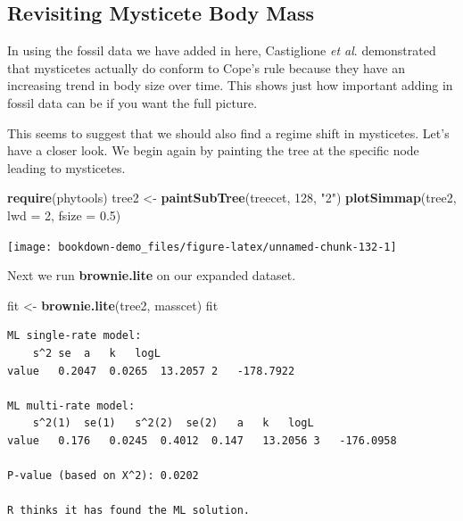 \documentclass[
]{book}
\newenvironment{Shaded}{\begin{snugshade}}{\end{snugshade}}
\newcommand{\DataTypeTok}[1]{\textcolor[rgb]{0.13,0.29,0.53}{#1}}
\newcommand{\DecValTok}[1]{\textcolor[rgb]{0.00,0.00,0.81}{#1}}
\newcommand{\FloatTok}[1]{\textcolor[rgb]{0.00,0.00,0.81}{#1}}
\newcommand{\KeywordTok}[1]{\textcolor[rgb]{0.13,0.29,0.53}{\textbf{#1}}}
\newcommand{\NormalTok}[1]{#1}
\newcommand{\StringTok}[1]{\textcolor[rgb]{0.31,0.60,0.02}{#1}}
\begin{document}
\hypertarget{revisiting-mysticete-body-mass}{%
\subsection{Revisiting Mysticete Body Mass}\label{revisiting-mysticete-body-mass}}

In using the fossil data we have added in here, Castiglione \emph{et al}. \citeyearpar{Castiglione20} demonstrated that mysticetes actually do conform to Cope's rule because they have an increasing trend in body size over time. This shows just how important adding in fossil data can be if you want the full picture.

This seems to suggest that we should also find a regime shift in mysticetes. Let's have a closer look. We begin again by painting the tree at the specific node leading to mysticetes.

\begin{Shaded}
\begin{Highlighting}[]
\KeywordTok{require}\NormalTok{(phytools)}
\NormalTok{tree2 \textless{}{-}}\StringTok{ }\KeywordTok{paintSubTree}\NormalTok{(treecet, }\DecValTok{128}\NormalTok{, }\StringTok{"2"}\NormalTok{)}
\KeywordTok{plotSimmap}\NormalTok{(tree2, }\DataTypeTok{lwd =} \DecValTok{2}\NormalTok{, }\DataTypeTok{fsize =} \FloatTok{0.5}\NormalTok{)}
\end{Highlighting}
\end{Shaded}

\begin{center}\texttt{[image: bookdown-demo\_files/figure-latex/unnamed-chunk-132-1]} \end{center}

Next we run \textbf{brownie.lite} on our expanded dataset.

\begin{Shaded}
\begin{Highlighting}[]
\NormalTok{fit \textless{}{-}}\StringTok{ }\KeywordTok{brownie.lite}\NormalTok{(tree2, masscet)}
\NormalTok{fit}
\end{Highlighting}
\end{Shaded}

\begin{verbatim}
ML single-rate model:
    s^2 se  a   k   logL
value   0.2047  0.0265  13.2057 2   -178.7922   

ML multi-rate model:
    s^2(1)  se(1)   s^2(2)  se(2)   a   k   logL    
value   0.176   0.0245  0.4012  0.147   13.2056 3   -176.0958

P-value (based on X^2): 0.0202 

R thinks it has found the ML solution.
\end{verbatim}
\end{document}
